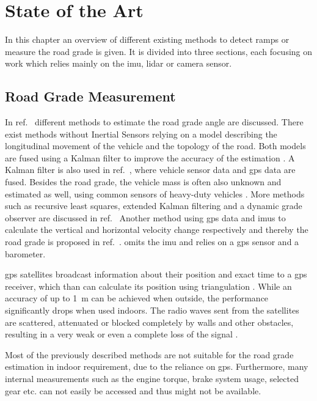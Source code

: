 \chapter{State of the Art}
\label{ch:StateOfTheArt}
In this chapter an overview of different existing methods to detect ramps or measure the road grade is given.
It is divided into three sections, each focusing on work which relies mainly on the \gls{imu}, \gls{lidar} or camera sensor.

\section{Road Grade Measurement}
In ref.~\cite{Jauch2018} different methods to estimate the road grade angle are discussed.
There exist methods without Inertial Sensors relying on a model describing the longitudinal movement of the vehicle and the topology of the road.
Both models are fused using a Kalman filter to improve the accuracy of the estimation \cite{Sahlholm2007}.
A Kalman filter is also used in ref.~\cite{Sahlholm2010}, where vehicle sensor data and \gls{gps} data are fused.
Besides the road grade, the vehicle mass is often also unknown and estimated as well, using common sensors of heavy-duty vehicles \cite{Sahlholm2010, Maleej2014}.
More methods such as recursive least squares, extended Kalman filtering and a dynamic grade observer are discussed in ref.~\cite{Kidambi2014}
Another method using \gls{gps} data and \glspl{imu} to calculate the vertical and horizontal velocity change respectively and thereby the road grade is proposed in ref.~\cite{Ryu2004}.
\cite{YazdaniBoroujeni2014} omits the \gls{imu} and relies on a \gls{gps} sensor and a barometer.\par
\gls{gps} satellites broadcast information about their position and exact time to a \gls{gps} receiver, which than can calculate its position using triangulation \cite{Mainetti2014}.
While an accuracy of up to \SI{1}{\metre} can be achieved when outside, the performance significantly drops when used indoors.
The radio waves sent from the satellites are scattered, attenuated or blocked completely by walls and other obstacles, resulting in a very weak or even a complete loss of the signal \cite{Ozdenizci2015}.\par
Most of the previously described methods are not suitable for the road grade estimation in indoor requirement, due to the reliance on \gls{gps}.
Furthermore, many internal measurements such as the engine torque, brake system usage, selected gear etc. can not easily be accessed and thus might not be available.\par
